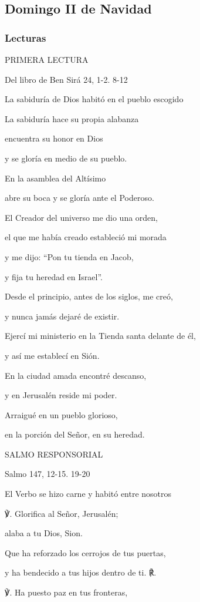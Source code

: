 \documentclass[]{article}
\begin{document}
\subsection{Domingo II de Navidad}\label{domingo-ii-de-navidad}

\subsubsection{Lecturas}\label{lecturas-10}

PRIMERA LECTURA

Del libro de Ben Sirá 24, 1-2. 8-12

La sabiduría de Dios habitó en el pueblo escogido

La sabiduría hace su propia alabanza

encuentra su honor en Dios

y se gloría en medio de su pueblo.

En la asamblea del Altísimo

abre su boca y se gloría ante el Poderoso.

El Creador del universo me dio una orden,

el que me había creado estableció mi morada

y me dijo: ``Pon tu tienda en Jacob,

y fija tu heredad en Israel''.

Desde el principio, antes de los siglos, me creó,

y nunca jamás dejaré de existir.

Ejercí mi ministerio en la Tienda santa delante de él,

y así me establecí en Sión.

En la ciudad amada encontré descanso,

y en Jerusalén reside mi poder.

Arraigué en un pueblo glorioso,

en la porción del Señor, en su heredad.

SALMO RESPONSORIAL

Salmo 147, 12-15. 19-20

El Verbo se hizo carne y habitó entre nosotros

℣. Glorifica al Señor, Jerusalén;

alaba a tu Dios, Sion.

Que ha reforzado los cerrojos de tus puertas,

y ha bendecido a tus hijos dentro de ti. ℟.

℣. Ha puesto paz en tus fronteras,
\end{document}
